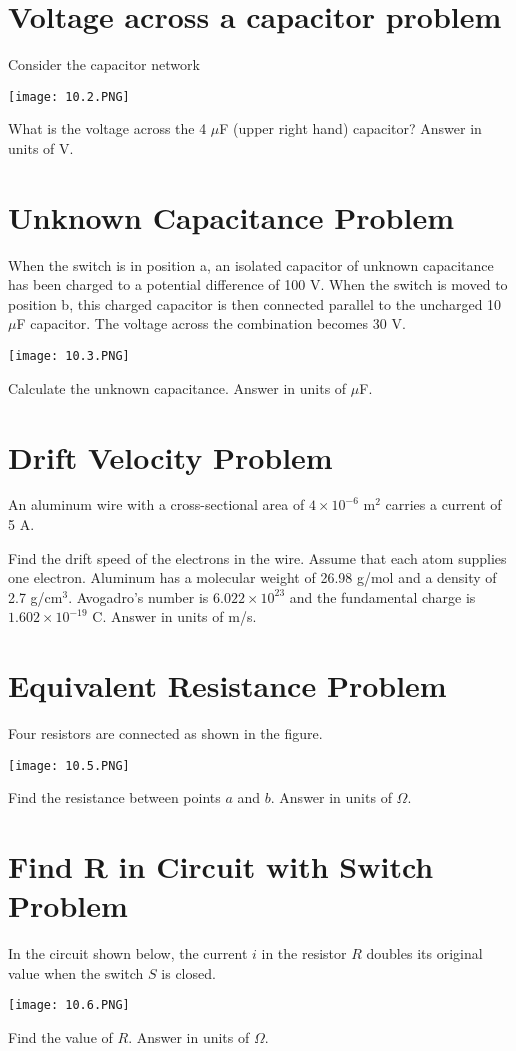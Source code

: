 \documentclass[../physics12.tex]{subfiles}
\begin{document}
\section{Voltage across a capacitor problem}
Consider the capacitor network
\begin{center}
    \texttt{[image: 10.2.PNG]}
\end{center}
What is the voltage across the 4 $\mu$F (upper right hand) capacitor? Answer in units of V.

\section{Unknown Capacitance Problem}
When the switch is in position a, an isolated capacitor of unknown capacitance has been charged to a potential difference of 100 V. When the switch 
is moved to position b, this charged capacitor is then connected parallel to the uncharged 10 $\mu$F capacitor. The voltage across the combination becomes 30 V.
\begin{center}
    \texttt{[image: 10.3.PNG]}
\end{center}
Calculate the unknown capacitance. Answer in units of $\mu$F.

\section{Drift Velocity Problem}
An aluminum wire with a cross-sectional area of $4\times 10^{-6}$ m$^2$ carries a current of 5 A. 

Find the drift speed of the electrons in the wire. Assume that each atom supplies one electron. Aluminum has a molecular weight of 26.98 g/mol and a density of 
2.7 g/cm$^3$. Avogadro's number is $6.022\times 10^{23}$ and the fundamental charge is $1.602\times 10^{-19}$ C. Answer in units of m/s.

\section{Equivalent Resistance Problem}
Four resistors are connected as shown in the figure.
\begin{center}
    \texttt{[image: 10.5.PNG]}
\end{center}
Find the resistance between points $a$ and $b$. Answer in units of $\Omega$.

\section{Find R in Circuit with Switch Problem}
In the circuit shown below, the current $i$ in the resistor $R$ doubles its original value when the switch $S$ is closed.
\begin{center}
    \texttt{[image: 10.6.PNG]}
\end{center}
Find the value of $R$. Answer in units of $\Omega$.
\end{document}
